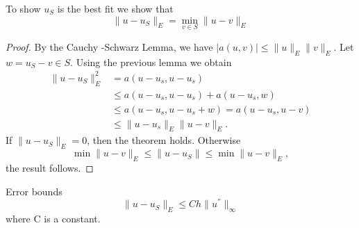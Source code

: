 \begin{theorem}
To show $u_{S}$ is the best fit we show that
\[\lVert u-u_S\rVert_E = \min_{v\in S}\lVert u-v\rVert_E \]
\end{theorem}
\begin{proof}
By the Cauchy -Schwarz Lemma, we have $|a(u,v)|\leq \lVert u\rVert_E\lVert v\rVert_E$.
Let $w=u_S-v \in S$. Using the previous lemma we obtain
\[\begin{array}{ll}
\lVert u-u_S\rVert ^2_E & = a(u-u_s,u-u_s)\\
& \leq a(u-u_s,u-u_s)+a(u-u_s,w)\\
& \leq a(u-u_s,u-u_s+w)=a(u-u_s,u-v)\\
& \leq \lVert u-u_s\rVert_{E}\lVert u-v\rVert_E.
\end{array} \]
If $\lVert u-u_S \rVert_E=0$, then the theorem holds. Otherwise
\[\min \lVert u-v\rVert_E\leq \lVert u-u_S\rVert  \leq \min\lVert u-v\rVert_E, \]
the result follows.
\end{proof}
\begin{theorem}
Error bounds
\[\lVert u-u_S\rVert_E \leq C h\lVert u^{''}\rVert_\infty\]
where C is a constant.
\end{theorem}

